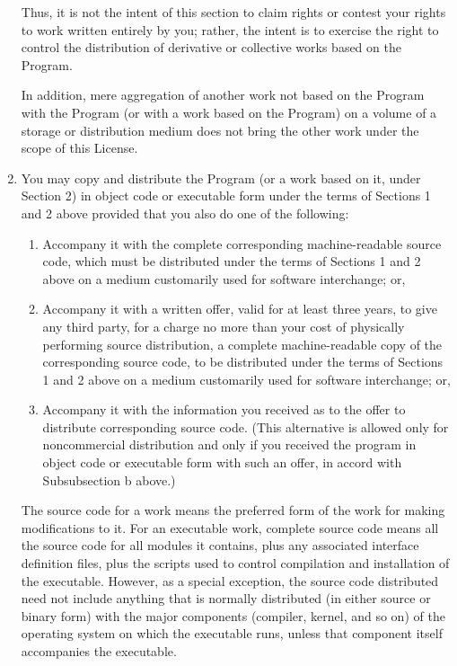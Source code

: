 \begin{enumerate}
Thus, it is not the intent of this section to claim rights or contest
your rights to work written entirely by you; rather, the intent is to
exercise the right to control the distribution of derivative or
collective works based on the Program.

In addition, mere aggregation of another work not based on the Program
with the Program (or with a work based on the Program) on a volume of
a storage or distribution medium does not bring the other work under
the scope of this License.

\item
You may copy and distribute the Program (or a work based on it,
under Section 2) in object code or executable form under the terms of
Sections 1 and 2 above provided that you also do one of the following:

\begin{enumerate}

\item
Accompany it with the complete corresponding machine-readable
source code, which must be distributed under the terms of Sections
1 and 2 above on a medium customarily used for software interchange; or,

\item
Accompany it with a written offer, valid for at least three
years, to give any third party, for a charge no more than your
cost of physically performing source distribution, a complete
machine-readable copy of the corresponding source code, to be
distributed under the terms of Sections 1 and 2 above on a medium
customarily used for software interchange; or,

\item
Accompany it with the information you received as to the offer
to distribute corresponding source code.  (This alternative is
allowed only for noncommercial distribution and only if you
received the program in object code or executable form with such
an offer, in accord with Subsubsection b above.)

\end{enumerate}


The source code for a work means the preferred form of the work for
making modifications to it.  For an executable work, complete source
code means all the source code for all modules it contains, plus any
associated interface definition files, plus the scripts used to
control compilation and installation of the executable.  However, as a
special exception, the source code distributed need not include
anything that is normally distributed (in either source or binary
form) with the major components (compiler, kernel, and so on) of the
operating system on which the executable runs, unless that component
itself accompanies the executable.


\end{enumerate}
